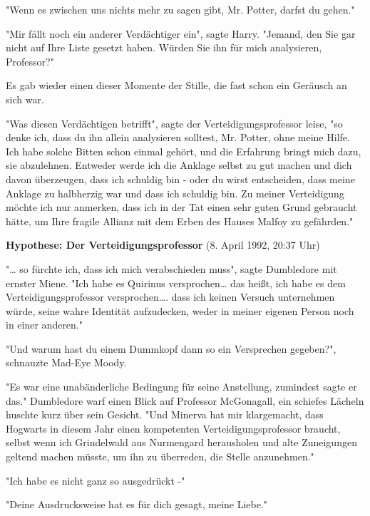 {"Wenn es zwischen uns nichts mehr zu sagen gibt, Mr. Potter, darfst du gehen."

"Mir fällt noch ein anderer Verdächtiger ein", sagte Harry. "Jemand, den Sie gar nicht auf Ihre Liste gesetzt haben. Würden Sie ihn für mich analysieren, Professor?"

Es gab wieder einen dieser Momente der Stille, die fast schon ein Geräusch an sich war.

"Was diesen Verdächtigen betrifft", sagte der Verteidigungsprofessor leise, "so denke ich, dass du ihn allein analysieren solltest, Mr. Potter, ohne meine Hilfe. Ich habe solche Bitten schon einmal gehört, und die Erfahrung bringt mich dazu, sie abzulehnen. Entweder werde ich die Anklage selbst zu gut machen und dich davon überzeugen, dass ich schuldig bin - oder du wirst entscheiden, dass meine Anklage zu halbherzig war und dass ich schuldig bin. Zu meiner Verteidigung möchte ich nur anmerken, dass ich in der Tat einen sehr guten Grund gebraucht hätte, um Ihre fragile Allianz mit dem Erben des Hauses Malfoy zu gefährden."

\textbf{Hypothese: Der Verteidigungsprofessor} (8. April 1992, 20:37 Uhr)

"… so fürchte ich, dass ich mich verabschieden muss", sagte Dumbledore mit ernster Miene. "Ich habe es Quirinus versprochen… das heißt, ich habe es dem Verteidigungsprofessor versprochen…. dass ich keinen Versuch unternehmen würde, seine wahre Identität aufzudecken, weder in meiner eigenen Person noch in einer anderen."

"Und warum hast du einem Dummkopf dann so ein Versprechen gegeben?", schnauzte Mad-Eye Moody.

"Es war eine unabänderliche Bedingung für seine Anstellung, zumindest sagte er das." Dumbledore warf einen Blick auf Professor McGonagall, ein schiefes Lächeln huschte kurz über sein Gesicht. "Und Minerva hat mir klargemacht, dass Hogwarts in diesem Jahr einen kompetenten Verteidigungsprofessor braucht, selbst wenn ich Grindelwald aus Nurmengard herausholen und alte Zuneigungen geltend machen müsste, um ihn zu überreden, die Stelle anzunehmen."

"Ich habe es nicht ganz so ausgedrückt -"

"Deine Ausdrucksweise hat es für dich gesagt, meine Liebe."

}
